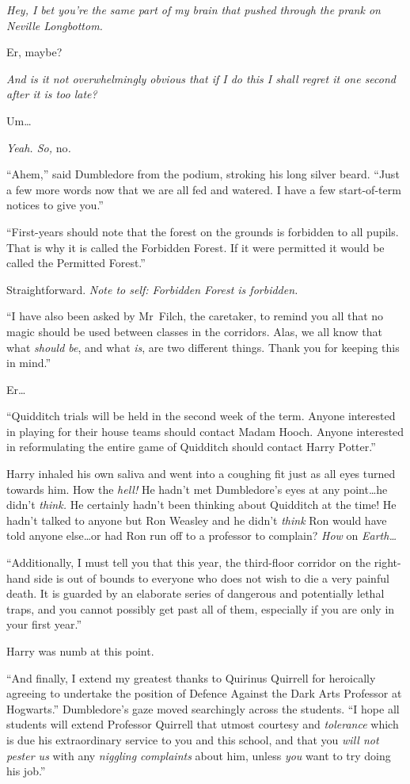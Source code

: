 \emph{Hey, I bet you’re the same part of my brain that pushed through the prank on Neville Longbottom.}

Er, maybe?

\emph{And is it not \emph{overwhelmingly} obvious that if I do this I shall regret it one second after it is too late?}

Um…

\emph{Yeah. So,} no\emph{.}

“Ahem,” said Dumbledore from the podium, stroking his long silver beard. “Just a few more words now that we are all fed and watered. I have a few start-of-term notices to give you.”

“First-years should note that the forest on the grounds is forbidden to all pupils. That is why it is called the Forbidden Forest. If it were permitted it would be called the Permitted Forest.”

Straightforward. \emph{Note to self: Forbidden Forest is forbidden.}

“I have also been asked by Mr~Filch, the caretaker, to remind you all that no magic should be used between classes in the corridors. Alas, we all know that what \emph{should be}, and what \emph{is}, are two different things. Thank you for keeping this in mind.”

Er…

“Quidditch trials will be held in the second week of the term. Anyone interested in playing for their house teams should contact Madam Hooch. Anyone interested in reformulating the entire game of Quidditch should contact Harry Potter.”

Harry inhaled his own saliva and went into a coughing fit just as all eyes turned towards him. How the \emph{hell!} He hadn’t met Dumbledore’s eyes at any point…he didn’t \emph{think.} He certainly hadn’t been thinking about Quidditch at the time! He hadn’t talked to anyone but Ron Weasley and he didn’t \emph{think} Ron would have told anyone else…or had Ron run off to a professor to complain? \emph{How} on \emph{Earth…}

“Additionally, I must tell you that this year, the third-floor corridor on the right-hand side is out of bounds to everyone who does not wish to die a very painful death. It is guarded by an elaborate series of dangerous and potentially lethal traps, and you cannot possibly get past all of them, especially if you are only in your first year.”

Harry was numb at this point.

“And finally, I extend my greatest thanks to Quirinus Quirrell for heroically agreeing to undertake the position of Defence Against the Dark Arts Professor at Hogwarts.” Dumbledore’s gaze moved searchingly across the students. “I hope all students will extend Professor Quirrell that utmost courtesy and \emph{tolerance} which is due his extraordinary service to you and this school, and that you \emph{will not pester us} with any \emph{niggling complaints} about him, unless \emph{you} want to try doing his job.”

